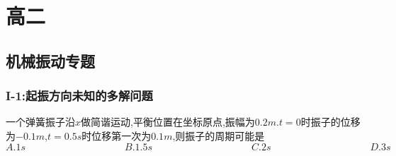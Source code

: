\documentclass{article}
\begin{document}
\vspace{2em}

\section{高二}

\subsection{机械振动专题}
\subsubsection{I-1:起振方向未知的多解问题}
一个弹簧振子沿$x$做简谐运动,平衡位置在坐标原点,振幅为$0.2m$.$t= 0$时振子的位移为$-0.1m$,$t = 0.5s$时位移第一次为$0.1m$,则振子的周期可能是
$$
    A. 1s   \hspace{10em}    B. 1.5s      \hspace{10em}    C. 2s      \hspace{10em}    D. 3s
$$
\end{document}
